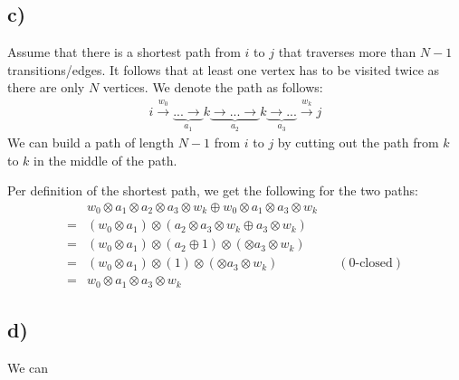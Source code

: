 \documentclass[a4paper,12pt]{ETHexercise}
\begin{document}
\subsection*{c)}
Assume that there is a shortest path from $i$ to $j$ that traverses more than $N-1$ transitions/edges.
It follows that at least one vertex has to be visited twice as there are only $N$ vertices.
We denote the path as follows:
\begin{align}
    i \stackrel{w_0}{\rightarrow} \underbrace{... \rightarrow}_{a_1} k \underbrace{\rightarrow ... \rightarrow}_{a_2} k \underbrace{\rightarrow ...}_{a_3} \stackrel{w_k}{\rightarrow} j
\end{align}
We can build a path of length $N-1$ from $i$ to $j$ by cutting out the path from $k$ to $k$ in the middle of the path. 

Per definition of the shortest path, we get the following for the two paths:
\begin{align}
    &w_0 \otimes a_1 \otimes a_2 \otimes a_3 \otimes w_k \oplus w_0 \otimes a_1 \otimes a_3 \otimes w_k\\
    = &(w_0 \otimes a_1) \otimes (a_2 \otimes a_3 \otimes w_k \oplus a_3 \otimes w_k)\\
    = &(w_0 \otimes a_1) \otimes (a_2 \oplus 1) \otimes (\otimes a_3 \otimes w_k)\\
    = &(w_0 \otimes a_1) \otimes (1) \otimes (\otimes a_3 \otimes w_k) &&(\text{0-closed})\\
    = &w_0 \otimes a_1 \otimes a_3 \otimes w_k
\end{align}

\subsection*{d)}
We can
\end{document}
